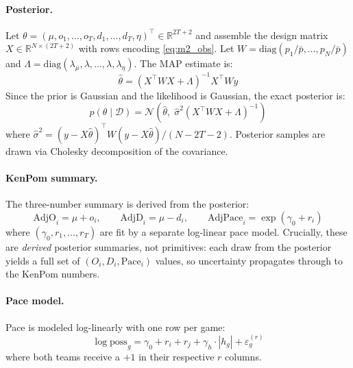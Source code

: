 \documentclass[11pt]{article}
\newcommand{\R}{\mathbb{R}}
\newcommand{\N}{\mathcal{N}}
\begin{document}
\paragraph{Posterior.}  Let $\theta = (\mu, o_1,\ldots,o_T, d_1,\ldots,d_T, \eta)^\top \in \R^{2T+2}$ and assemble the design matrix $X \in \R^{N \times (2T+2)}$ with rows encoding \eqref{eq:m2_obs}.  Let $W = \mathrm{diag}(p_1/\bar{p}, \ldots, p_N/\bar{p})$ and $\Lambda = \mathrm{diag}(\lambda_\mu, \lambda, \ldots, \lambda, \lambda_\eta)$.  The MAP estimate is:
\begin{equation}
  \hat\theta = \left(X^\top W X + \Lambda\right)^{-1} X^\top W y
  \label{eq:ridge}
\end{equation}
Since the prior is Gaussian and the likelihood is Gaussian, the exact posterior is:
\begin{equation}
  p(\theta \mid \mathcal{D}) = \N\!\left(\hat\theta,\;
    \hat\sigma^2 \left(X^\top W X + \Lambda\right)^{-1}\right)
  \label{eq:posterior}
\end{equation}
where $\hat\sigma^2 = (y - X\hat\theta)^\top W (y - X\hat\theta) / (N - 2T - 2)$.
Posterior samples are drawn via Cholesky decomposition of the covariance.

\paragraph{KenPom summary.}  The three-number summary is derived from the posterior:
\begin{equation}
  \text{AdjO}_i = \mu + o_i, \qquad
  \text{AdjD}_i = \mu - d_i, \qquad
  \text{AdjPace}_i = \exp(\gamma_0 + r_i)
  \label{eq:kenpom}
\end{equation}
where $(\gamma_0, r_1,\ldots,r_T)$ are fit by a separate log-linear pace model.
Crucially, these are \emph{derived} posterior summaries, not primitives: each draw from the posterior yields a full set of $(O_i, D_i, \text{Pace}_i)$ values, so uncertainty propagates through to the KenPom numbers.

\paragraph{Pace model.}  Pace is modeled log-linearly with one row per game:
\begin{equation}
  \log \text{poss}_g = \gamma_0 + r_i + r_j + \gamma_h \cdot |h_g| + \varepsilon_g^{(r)}
\end{equation}
where both teams receive a $+1$ in their respective $r$ columns.
\end{document}
